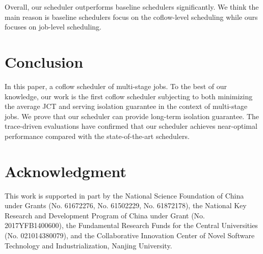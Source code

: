 \documentclass[10pt, conference, letterpaper]{IEEEtran}
\begin{document}
Overall, our scheduler outperforms baseline schedulers significantly. We think the main reason is baseline schedulers focus on the coflow-level scheduling while ours focuses on job-level scheduling.

\section{Conclusion}
In this paper, a coflow scheduler of multi-stage jobs. To the best of our knowledge, our work is the first coflow scheduler subjecting to both minimizing the average JCT and serving isolation guarantee in the context of multi-stage jobs. We prove that our scheduler can provide long-term isolation guarantee. The trace-driven evaluations have confirmed that our scheduler achieves near-optimal performance compared with the state-of-the-art schedulers.

\section*{Acknowledgment}
This work is supported in part by the National Science Foundation of China under Grants (No. 61672276, No. 61502229, No. 61872178), the National Key Research and Development Program of China under Grant (No. 2017YFB1400600), the Fundamental Research Funds for the Central Universities (No. 021014380079), and the Collaborative Innovation Center of Novel Software Technology and Industrialization, Nanjing University.




\end{document}

